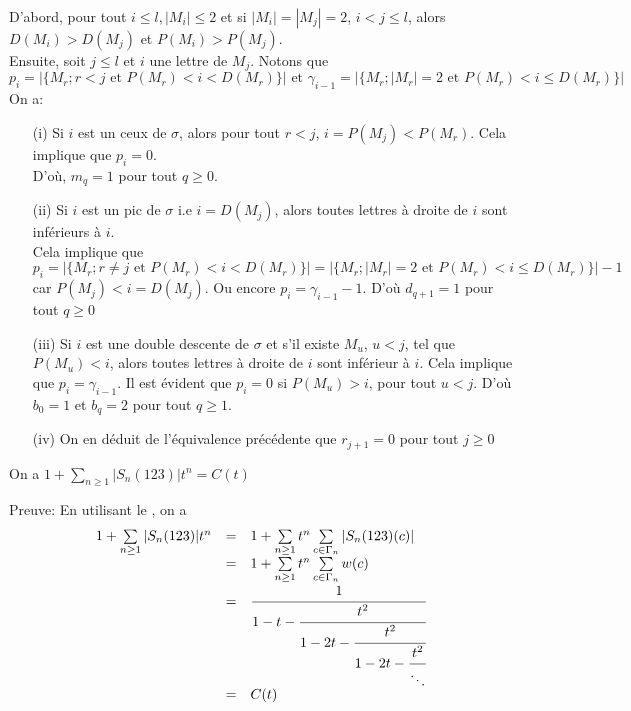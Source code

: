 D'abord, pour tout $i\leq l, |M_{i}|\leq 2 $ et si $|M_{i}|=|M_{j}|=2$, $i<j \leq l$, alors $D(M_{i})>D(M_{j})$ et
$P(M_{i})>P(M_{j})$.\vspace{5pt}\\
Ensuite, soit $j\leq l$ et $i$ une lettre de $M_{j}$. Notons que
$$p_{i}=| \{M_{r}; r<j \text{ et } P(M_{r})<i<D(M_{r})\} | \text{ et }\gamma_{i-1}=| \{M_{r};|M_{r}|=2 \text{ et } P(M_{r})<i \leq D(M_{r})\} |$$
On a:
\begin{itemize}
	\item [(i)] Si $i$ est un ceux de $\sigma$, alors pour tout $r<j$, $i=P(M_{j})<P(M_{r})$. Cela implique que $p_{i}=0$.\\
	      D'où, $m_{q}=1$ pour tout $q\geq 0$.
	\item [(ii)] Si $i$ est un pic de $\sigma$ i.e $i=D(M_{j})$, alors toutes lettres à droite de $i$ sont inférieurs à $i$. \\
	      Cela implique que $$p_{i} = | \{M_{r}; r \neq j \text{ et } P(M_{r})<i<D(M_{r})\} | = | \{M_{r}; |M_{r}|=2 \text{ et } P(M_{r})<i \leq D(M_{r})\} |-1$$ car $P(M_{j})< i=D(M_{j})$. Ou encore $p_{i}=\gamma_{i-1}-1$. D'où $d_{q+1}=1$ pour tout $q\geq 0$
	\item [(iii)] Si $i$ est une double descente de $\sigma$ et s'il existe $M_{u}$, $u<j$, tel que $P(M_{u})<i$, alors toutes lettres à droite de $i$ sont inférieur à $i$. Cela implique que $p_{i}=\gamma_{i-1}$. Il est évident que $p_{i}=0$ si $P(M_{u})>i$, pour tout $u<j$. D'où  $b_{0}=1$ et $b_{q}=2$ pour tout $q\geq 1$.
	\item[(iv)] On en déduit de l'équivalence précédente que $r_{j+1}=0$ pour tout $j \geq 0$
\end{itemize}
\begin{proposition}
	On a $1+\sum\limits_{n\geq 1}| S_{n}(123) |t^{n}=C(t)$
\end{proposition}
Preuve: En utilisant le , on a
\[
	\begin{array}{l l l}
		1+\sum\limits_{n\geq 1}| S_{n}(123) |t^{n} & = & 1+\sum\limits_{n\geq 1}t^{n}\sum\limits_{c\in \Gamma_{n}}|S_{n}(123)(c)|     \\
		                                           & = & 1+\sum\limits_{n\geq 1}t^{n}\sum\limits_{c\in \Gamma_{n}}w(c)                \\
		                                           & = & \cfrac{1}{1-t-\cfrac{t^{2}}{1-2t-\cfrac{t^{2}}{1-2t-\cfrac{t^{2}}{\ddots}}}} \\
		                                           & = & C(t)
	\end{array}
\]
